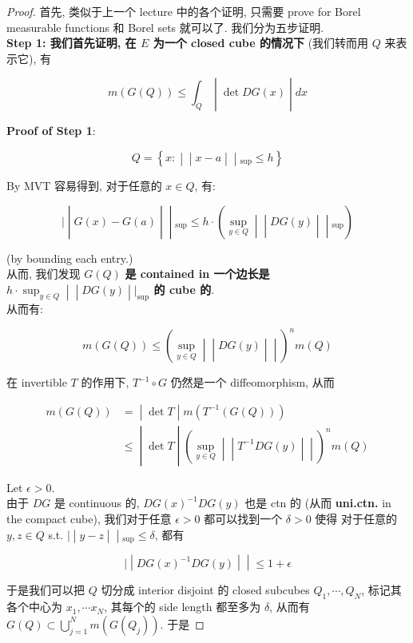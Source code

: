 \documentclass{qlnotes-export}
\begin{document}
\begin{proof}

首先, 类似于上一个 lecture 中的各个证明, 只需要 prove for Borel measurable functions 和 Borel sets 就可以了. 我们分为五步证明.\\
\textbf{Step 1: 我们首先证明, 在 \(E\) 为一个 closed cube 的情况下} (我们转而用 \(Q\) 来表示它), 有

\[\left. m(G(Q)) \leq \int_{Q} \middle| \det DG(x) \middle| dx \right.\]

\textbf{Proof of Step 1}:

\[Q = \left\{ x: \middle| \middle| x - a \middle| \middle| {}_{\sup} \leq h \right\}\]

By MVT 容易得到, 对于任意的 \(x \in Q\), 有:

\[\left. | \middle| G(x) - G(a) \middle| \middle| {}_{\sup} \leq h \cdot (\sup\limits_{y \in Q} \middle| \middle| DG(y) \middle| \middle| {}_{\sup}) \right.\]

(by bounding each entry.)\\
从而, 我们发现 \(G(Q)\) \textbf{是 contained in 一个边长是 \(\left. h \cdot \sup_{y \in Q} \middle| \middle| DG(y) \middle| |_{\sup} \right.\) 的 cube 的}.\\
从而有:

\[\left. m(G(Q)) \leq (\sup\limits_{y \in Q} \middle| \middle| DG(y) \middle| \middle| )^{n}m(Q) \right.\]

在 invertible \(T\) 的作用下, \(T^{- 1} \circ G\) 仍然是一个 diffeomorphism, 从而

\[\begin{matrix}
{m(G(Q))} & \left. = \middle| \det T \middle| m(T^{- 1}(G(Q))) \right. \\
 & \left. \leq \middle| \det T \middle| (\sup\limits_{y \in Q} \middle| \middle| T^{- 1}DG(y) \middle| \middle| )^{n}m(Q) \right.
\end{matrix}\]

Let \(\epsilon > 0\).\\
由于 \(DG\) 是 continuous 的, \(DG(x)^{- 1}DG(y)\) 也是 ctn 的 (从而 \textbf{uni.ctn.} in the compact cube), 我们对于任意 \(\epsilon > 0\) 都可以找到一个 \(\delta > 0\) 使得 对于任意的 \(y,z \in Q\) s.t. \(\left. | \middle| y - z \middle| \middle| {}_{\sup} \leq \delta \right.\), 都有

\[\left. | \middle| DG(x)^{- 1}DG(y) \middle| \middle| \leq 1 + \epsilon \right.\]

于是我们可以把 \(Q\) 切分成 interior disjoint 的 closed subcubes \(Q_{1},\cdots,Q_{N}\), 标记其各个中心为 \(x_{1},\cdots x_{N}\), 其每个的 side length 都至多为 \(\delta\), 从而有 \(G(Q) \subset \bigcup_{j = 1}^{N}m(G(Q_{j}))\). 于是


\end{proof}
\end{document}
